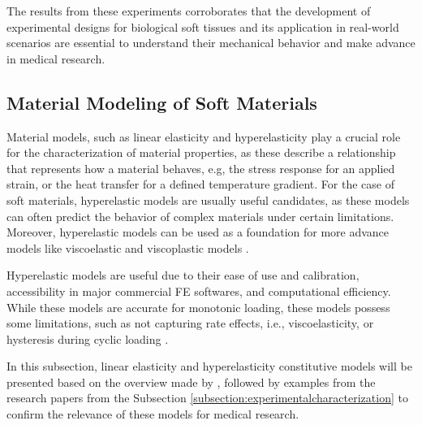The results from these experiments corroborates that the development of experimental designs for
biological soft tissues and its application in real-world scenarios are essential to understand 
their mechanical behavior and make advance in medical research.

\subsection{Material Modeling of Soft Materials}
\label{subsection:materialmodeling} 

Material models, such as linear elasticity and hyperelasticity play a crucial role for the characterization 
of material properties, as these describe a relationship that represents how a material behaves, e.g, 
the stress response for an applied strain, or the heat transfer for a defined temperature gradient.
For the case of soft materials, hyperelastic models are usually 
useful candidates, as these models can often predict the behavior of complex materials under certain limitations.
Moreover, hyperelastic models can be used as a foundation for more advance models like 
viscoelastic and viscoplastic models \cite{Bergström2015}. 

Hyperelastic models are useful due to their ease of use and calibration, accessibility in major commercial FE softwares, 
and computational efficiency. While these models are 
accurate for monotonic loading, these models possess some limitations, such as not capturing rate effects, i.e., viscoelasticity, or 
hysteresis during cyclic loading \cite{Bergström2015}.

In this subsection, linear elasticity and hyperelasticity constitutive models will be presented 
based on the overview made by \citet{Bergström2015}, followed by examples from the research 
papers from the Subsection \ref{subsection:experimentalcharacterization} to confirm the relevance of these 
models for medical research.

